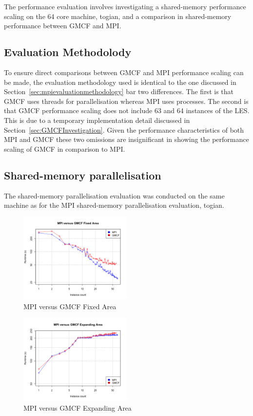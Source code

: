 The performance evaluation involves investigating a shared-memory performance
scaling on the 64 core machine, togian, and a comparison in shared-memory
performance between GMCF and MPI.

\subsection{Evaluation Methodolody}

To ensure direct comparisons between GMCF and MPI performance scaling can be
made, the evaluation methodology used is identical to the one discussed in
Section~\ref{sec:mpievaluationmethodology} bar two differences. The first is
that GMCF uses threads for parallelisation whereas MPI uses processes. The
second is that GMCF performance scaling does not include 63 and 64 instances of
the LES. This is due to a temporary implementation detail discussed in
Section~\ref{sec:GMCFInvestigation}. Given the performance characteristics of
both MPI and GMCF these two omissions are insignificant in showing the
performance scaling of GMCF in comparison to MPI.

\subsection{Shared-memory parallelisation}

The shared-memory parallelisation evaluation was conducted on the same machine
as for the MPI shared-memory parallelisation evaluation, togian.

\begin{figure}
    \includegraphics[width=0.5\textwidth]{graphs/GMCF-MPI-fixed-area.png}
    \caption{MPI versus GMCF Fixed Area}
    \label{fig:gmcfmpifixedarea}
\end{figure}

\begin{figure}
    \includegraphics[width=0.5\textwidth]{graphs/GMCF-MPI-expanding-area.png}
    \caption{MPI versus GMCF Expanding Area}
    \label{fig:gmcfmpiexpandingarea}
\end{figure}

